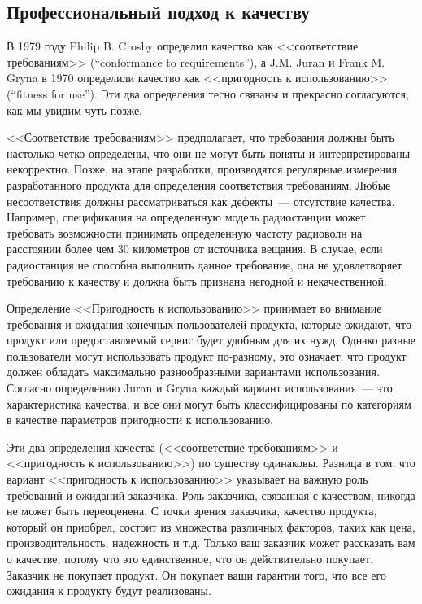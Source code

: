 \documentclass{../../text-style}
\begin{document}
\subsection{Профессиональный подход к качеству}

В 1979 году Philip B. Crosby определил качество как <<соответствие требованиям>> (``conformance to requirements''), а J.M. Juran и Frank M. Gryna в 1970 определили качество как <<пригодность к использованию>> (``fitness for use''). Эти два определения тесно связаны и прекрасно согласуются, как мы увидим чуть позже.

<<Соответствие требованиям>> предполагает, что требования должны быть настолько четко определены, что они не могут быть поняты и интерпретированы некорректно. Позже, на этапе разработки, производятся регулярные измерения разработанного продукта для определения соответствия требованиям. Любые несоответствия должны рассматриваться как дефекты~--- отсутствие качества. Например, спецификация на определенную модель радиостанции может требовать возможности принимать определенную частоту радиоволн на расстоянии более чем 30 километров от источника вещания. В случае, если радиостанция не способна выполнить данное требование, она не удовлетворяет требованию к качеству и должна быть признана негодной и некачественной.

Определение <<Пригодность к использованию>> принимает во внимание требования и ожидания конечных пользователей продукта, которые ожидают, что продукт или предоставляемый сервис будет удобным для их нужд. Однако разные пользователи могут использовать продукт по-разному, это означает, что продукт должен обладать максимально разнообразными вариантами использования. Согласно определению Juran и Gryna каждый вариант использования~--- это характеристика качества, и все они могут быть классифицированы по категориям в качестве параметров пригодности к использованию.

Эти два определения качества (<<соответствие требованиям>> и <<пригодность к использованию>>) по существу одинаковы. Разница в том, что вариант <<пригодность к использованию>> указывает на важную роль требований и ожиданий заказчика. Роль заказчика, связанная с качеством, никогда не может быть переоценена. С точки зрения заказчика, качество продукта, который он приобрел, состоит из множества различных факторов, таких как цена, производительность, надежность и т.д. Только ваш заказчик может рассказать вам о качестве, потому что это единственное, что он действительно покупает. Заказчик не покупает продукт. Он покупает ваши гарантии того, что все его ожидания к продукту будут реализованы.
\end{document}
